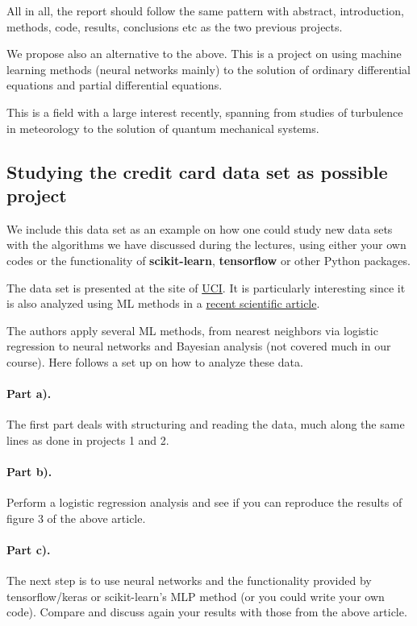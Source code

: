 \documentclass[%
oneside,                 %
final,                   %
10pt]{article}
\begin{document}
\noindent
All in all, the report should follow the same pattern with abstract, introduction, methods, code, results, conclusions etc as the two previous projects. 

We propose also an alternative to the above. This is a project on using machine learning methods (neural networks mainly) to the solution of ordinary differential equations and partial differential equations. 

This is a field with a large interest recently, spanning from studies of turbulence in meteorology to the solution of quantum mechanical systems. 

\subsection*{Studying the credit card data set as possible project}

We include this data set as an example on how one could study new data sets with the algorithms we have discussed during the lectures, using either your own codes or the functionality of \textbf{scikit-learn}, \textbf{tensorflow} or other Python packages.

The data set is presented at the site of  \href{{https://archive.ics.uci.edu/ml/datasets/default+of+credit+card+clients}}{UCI}. It is particularly interesting since it is also analyzed using ML methods in a \href{{https://bradzzz.gitbooks.io/ga-seattle-dsi/content/dsi/dsi_05_classification_databases/2.1-lesson/assets/datasets/DefaultCreditCardClients_yeh_2009.pdf}}{recent scientific article}.  

The authors apply several ML methods, from nearest neighbors via logistic regression to neural networks and Bayesian analysis (not covered much in our course).
Here follows a set up on how to analyze these data.

\paragraph{Part a).}
The first part deals with structuring and reading the data, much along the same lines as done in projects 1 and 2. 

\paragraph{Part b).}
Perform a logistic regression analysis and see if you can reproduce the results of figure 3 of the above article. 

\paragraph{Part c).}
The next step is to use neural networks and the  functionality provided by tensorflow/keras or scikit-learn's MLP method (or you could write your own code). Compare and discuss again your results with those from the above article.
\end{document}
